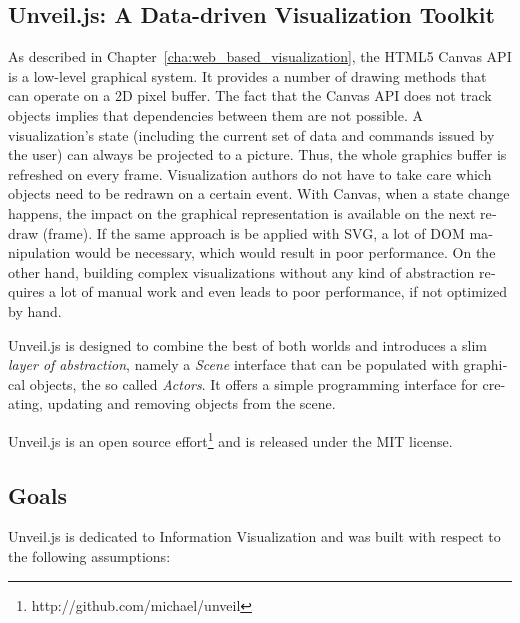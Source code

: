 \begin{english}

\chapter{Unveil.js: A Data-driven Visualization Toolkit}
\label{cha:unveil}


As described in Chapter~\ref{cha:web_based_visualization}, the HTML5 Canvas API is a low-level graphical system. It provides a number of drawing methods that can operate on a 2D pixel buffer. The fact that the Canvas API does not track objects implies that dependencies between them are not possible. A visualization's state (including the current set of data and commands issued by the user) can always be projected to a picture. Thus, the whole graphics buffer is refreshed on every frame. Visualization authors do not have to take care which objects need to be redrawn on a certain event. With Canvas, when a state change happens, the impact on the graphical representation is available on the next redraw (frame). If the same approach is be applied with SVG, a lot of DOM manipulation would be necessary, which would result in poor performance. On the other hand, building complex visualizations without any kind of abstraction requires a lot of manual work and even leads to poor performance, if not optimized by hand.

Unveil.js is designed to combine the best of both worlds and introduces a slim \emph{layer of abstraction}, namely a \emph{Scene} interface that can be populated with graphical objects, the so called \emph{Actors}. It offers a simple programming interface for creating, updating and removing objects from the scene.

Unveil.js is an open source effort\footnote{http://github.com/michael/unveil} and is released under the MIT license.


\section{Goals}

Unveil.js is dedicated to Information Visualization and was built with respect to the following assumptions:


\end{english}
